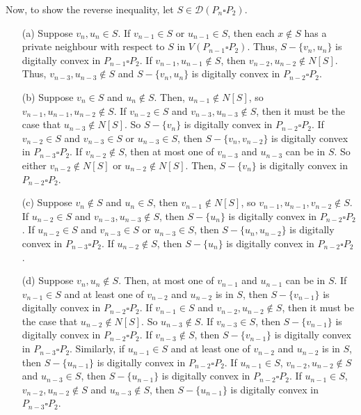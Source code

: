\documentclass[12pt]{article}
\begin{document}
Now, to show the reverse inequality, let $S\in \mathscr{D}(P_n\square P_2)$. \begin{enumerate}
\item[(a)] Suppose $v_n,u_n\in S$. If $v_{n-1}\in S$ or  $u_{n-1}\in S$, then each $x\not\in S$ has a private neighbour with respect to $S$ in $V(P_{n-1}\square P_2)$. Thus, $S-\{v_n,u_n\}$ is digitally convex in $P_{n-1}\square P_2$. If $v_{n-1}, u_{n-1}\not\in S$, then $v_{n-2}, u_{n-2}\not\in N[S]$. Thus, $v_{n-3}, u_{n-3}\not\in S$ and $S-\{v_n,u_n\}$ is digitally convex in $P_{n-2}\square P_2$. 

\item[(b)] Suppose $v_n\in S$ and $u_n\not\in S$. Then, $u_{n-1}\not\in N[S]$, so $v_{n-1}, u_{n-1}, u_{n-2}\not\in S$. If $v_{n-2}\in S$ and $v_{n-3}, u_{n-3}\not\in S$, then it must be the case that $u_{n-3}\not\in N[S]$. So $S-\{v_n\}$ is digitally convex in $P_{n-2}\square P_2$. If $v_{n-2}\in S$ and $v_{n-3}\in S$ or $u_{n-3}\in S$, then $S-\{v_n,v_{n-2}\}$ is digitally convex in $P_{n-3}\square P_2$. If $v_{n-2}\not\in S$, then at most one of $v_{n-3}$ and $u_{n-3}$ can be in $S$. So either $v_{n-2}\not\in N[S]$ or $u_{n-2}\not\in N[S]$. Then, $S-\{v_n\}$ is digitally convex in $P_{n-2}\square P_2$. 

\item[(c)] Suppose $v_n\not\in S$ and $u_n\in S$, then $v_{n-1}\not\in N[S]$, so $v_{n-1}, u_{n-1}, v_{n-2}\not\in S$. If $u_{n-2}\in S$ and $v_{n-3},u_{n-3}\not\in S$, then $S-\{u_n\}$ is digitally convex in $P_{n-2}\square P_2$. If $u_{n-2}\in S$ and $v_{n-3}\in S$ or $u_{n-3}\in S$, then $S-\{u_n,u_{n-2}\}$ is digitally convex in $P_{n-3}\square P_2$. If $u_{n-2}\not\in S$, then $S-\{u_n\}$ is digitally convex in $P_{n-2}\square P_2$. 

\item[(d)] Suppose $v_n,u_n\not\in S$. Then, at most one of $v_{n-1}$ and $u_{n-1}$ can be in $S$. If $v_{n-1}\in S$ and at least one of $v_{n-2}$ and $u_{n-2}$ is in $S$, then $S-\{v_{n-1}\}$ is digitally convex in $P_{n-2}\square P_2$. If $v_{n-1}\in S$ and $v_{n-2}, u_{n-2}\not\in S$, then it must be the case that $u_{n-2}\not\in N[S]$. So $u_{n-3}\not\in S$. If $v_{n-3}\in S$, then $S-\{v_{n-1}\}$ is digitally convex in $P_{n-2}\square P_2$. If $v_{n-3}\not\in S$, then $S-\{v_{n-1}\}$ is digitally convex in $P_{n-3}\square P_2$. Similarly, if $u_{n-1}\in S$ and at least one of $v_{n-2}$ and $u_{n-2}$ is in $S$, then $S-\{u_{n-1}\}$ is digitally convex in $P_{n-2}\square P_2$. If $u_{n-1}\in S$, $v_{n-2}, u_{n-2}\not\in S$ and $u_{n-3}\in S$, then $S-\{u_{n-1}\}$ is digitally convex in $P_{n-2}\square P_2$. If $u_{n-1}\in S$, $v_{n-2}, u_{n-2}\not\in S$ and $u_{n-3}\not\in S$, then $S-\{u_{n-1}\}$ is digitally convex in $P_{n-3}\square P_2$.

\end{enumerate}
\end{document}
